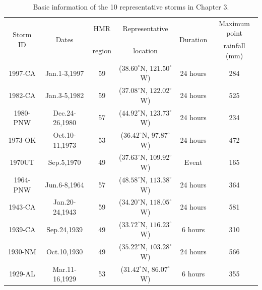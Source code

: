 \begin{table}[htbp]
	\centering
	\caption{Basic information of the 10 representative storms in Chapter 3.}
	\begin{tabular}{cccccc}
		\hline
		\multirow{2}{*}{Storm ID} & \multirow{2}{*}{Dates} & HMR & Representative & \multirow{2}{*}{Duration} & Maximum point\\
		& & region & location & & rainfall (mm)\\
		\hline
		1997-CA  & Jan.1-3,1997   & 59 & ($38.60^{\circ}$N, $121.50^{\circ}$W) & 24 hours & 284\\
		1982-CA  & Jan.3-5,1982   & 59 & ($37.08^{\circ}$N, $122.02^{\circ}$W) & 24 hours & 525\\
		1980-PNW & Dec.24-26,1980 & 57 & ($44.92^{\circ}$N, $123.73^{\circ}$W) & 24 hours & 234\\
		1973-OK  & Oct.10-11,1973 & 53 & ($36.42^{\circ}$N, $97.87^{\circ}$W)  & 24 hours & 472\\
		1970UT   & Sep.5,1970     & 49 & ($37.63^{\circ}$N, $109.92^{\circ}$W) & Event    & 165\\
		1964-PNW & Jun.6-8,1964   & 57 & ($48.58^{\circ}$N, $113.38^{\circ}$W) & 24 hours & 364\\
		1943-CA  & Jan.20-24,1943 & 59 & ($34.20^{\circ}$N, $118.05^{\circ}$W) & 24 hours & 581\\
		1939-CA  & Sep.24,1939    & 49 & ($33.72^{\circ}$N, $116.23^{\circ}$W) & 6 hours  & 310\\
		1930-NM  & Oct.10,1930    & 49 & ($35.22^{\circ}$N, $103.28^{\circ}$W) & 24 hours & 566\\
		1929-AL  & Mar.11-16,1929 & 53 & ($31.42^{\circ}$N, $86.07^{\circ}$W)  & 6 hours  & 355\\
		\hline
		
	\end{tabular}
	\label{table:3-1}
\end{table}

